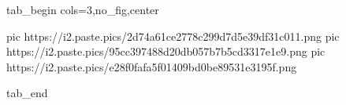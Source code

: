  
 
 
 
 


\ifcmt
  tab_begin cols=3,no_fig,center

     pic https://i2.paste.pics/2d74a61ce2778c299d7d5e39df31c011.png
		 pic https://i2.paste.pics/95cc397488d20db057b7b5cd3317e1e9.png
		 pic https://i2.paste.pics/e28f0fafa5f01409bd0be89531e3195f.png

  tab_end
\fi
